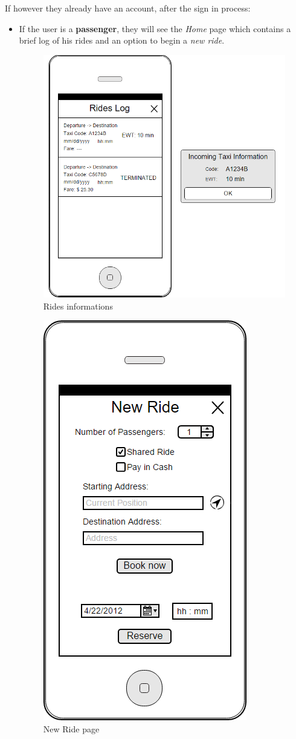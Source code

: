 \documentclass{article}
\begin{document}
If however they already have an account, after the sign in process:
\begin{itemize}
    
    \item If the user is a \textbf{passenger}, they will see the \textit{Home} page which contains a brief log of his rides and an option to begin a \textit{new ride}.
\begin{figure}[h!]
    \centering
    \includegraphics[width=0.56\columnwidth]{informations1/informations}
    \caption{Rides informations}
    \label{fig:mobile-ride_info}
\end{figure}
    \begin{figure}[h!]
        \centering
        \includegraphics[width=0.308\columnwidth]{New Ride/New Ride}
        \caption{New Ride page}
        \label{fig:mobile-new_ride}
    \end{figure}


\end{itemize}
\end{document}
